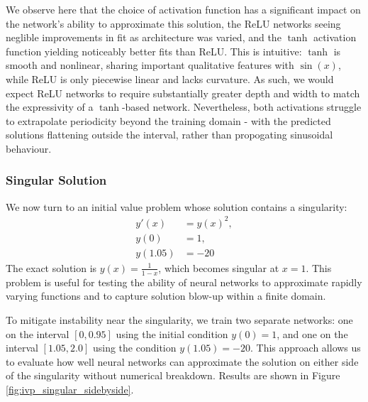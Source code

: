 We observe here that the choice of activation function has a significant impact on the network's 
ability to approximate this solution, the ReLU networks seeing neglible improvements 
in fit as architecture was varied, and the \(\tanh\) activation function yielding 
noticeably better fits than ReLU. This is intuitive: \(\tanh\) is smooth and nonlinear, 
sharing important qualitative features with \(\sin(x)\), while ReLU is only piecewise linear 
and lacks curvature. As such, we would expect ReLU networks to require substantially greater 
depth and width to match the expressivity of a \(\tanh\)-based network. 
Nevertheless, both activations struggle to extrapolate periodicity beyond the training domain -
with the predicted solutions flattening outside the interval, rather than 
propogating sinusoidal behaviour.


\subsubsection{Singular Solution}

We now turn to an initial value problem whose solution contains a singularity:
\[
\begin{aligned}
    y'(x) &= y(x)^2, \\
    y(0) &= 1, \\
    y(1.05) &= -20
\end{aligned}
\]
The exact solution is \( y(x) = \frac{1}{1 - x} \), which becomes singular at \( x = 1 \). This 
problem is useful for testing the ability of neural networks to approximate rapidly varying functions 
and to capture solution blow-up within a finite domain.

To mitigate instability near the singularity, we train two separate networks: one on the interval 
\([0, 0.95]\) using the initial condition \( y(0) = 1 \), and one on the interval \([1.05, 2.0] \) 
using the condition \( y(1.05) = -20 \). This approach allows us to evaluate how 
well neural networks can approximate the solution on either side of the singularity without 
numerical breakdown. Results are shown in Figure \ref{fig:ivp_singular_sidebyside}.

